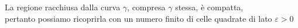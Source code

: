 \documentclass[preview]{standalone}
\begin{document}
\begin{center}
La regione racchiusa dalla curva $\gamma$, compresa $\gamma$ stessa, è compatta, \\pertanto possiamo ricoprirla con un numero finito di celle quadrate di lato $\varepsilon > 0$
\end{center}
\end{document}
